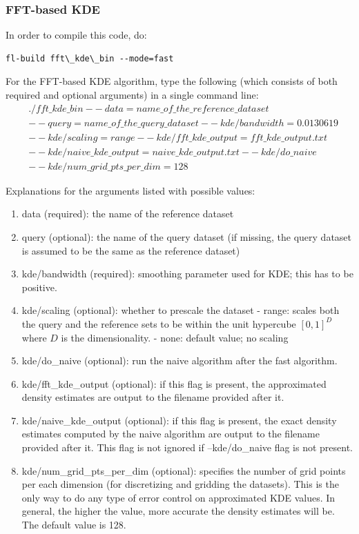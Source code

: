 \documentclass[letter]{report}
\begin{document}
\subsubsection{FFT-based KDE}
In order to compile this code, do: 
\begin{verbatim}
fl-build fft\_kde\_bin --mode=fast
\end{verbatim}
For the FFT-based KDE algorithm, type the
following (which consists of both required and optional arguments) in
a single command line:
\begin{align*}
& \mathit{./fft\_kde\_bin} \
\mathit{--data=name\_of\_the\_reference\_dataset}\\ &
\mathit{--query=name\_of\_the\_query\_dataset} \
\mathit{--kde/bandwidth=0.0130619} \\ & \mathit{--kde/scaling=range} \
\mathit{--kde/fft\_kde\_output=fft\_kde\_output.txt}\\ &
\mathit{--kde/naive\_kde\_output=naive\_kde\_output.txt} \
\mathit{--kde/do\_naive}\\ & \mathit{--kde/num\_grid\_pts\_per\_dim=128}
\end{align*}

Explanations for the arguments listed with possible values:

\begin{enumerate}
\item{data (required): the name of the reference dataset}
\item{query (optional): the name of the query dataset (if missing, the
 query dataset is assumed to be the same as the reference dataset)}
\item{kde/bandwidth (required): smoothing parameter used for KDE; this
 has to be positive.}
\item{kde/scaling (optional): whether to prescale the dataset - range:
scales both the query and the reference sets to be within the unit
hypercube $[0, 1]^D$ where $D$ is the dimensionality.  - none: default
value; no scaling}
\item{kde/do\_naive (optional): run the naive algorithm after the fast
algorithm.}
\item{kde/fft\_kde\_output (optional): if this flag is present, the
approximated density estimates are output to the filename provided
after it.}
\item{kde/naive\_kde\_output (optional): if this flag is present, the
 exact density estimates computed by the naive algorithm are output to
 the filename provided after it. This flag is not ignored if
 --kde/do\_naive flag is not present.}
\item{kde/num\_grid\_pts\_per\_dim (optional): specifies the number of
grid points per each dimension (for discretizing and gridding the
datasets). This is the only way to do any type of error control on
approximated KDE values. In general, the higher the value, more
accurate the density estimates will be. The default value is 128.}
\end{enumerate}
\end{document}
